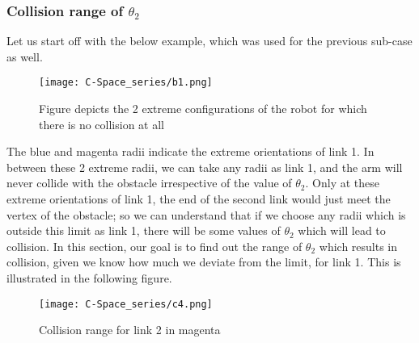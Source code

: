 \documentclass[12pt]{article}
\begin{document}
\subsubsection{Collision range of $\theta_2$}
Let us start off with the below example, which was used for the previous sub-case as well.
\begin{figure}[h!]
    \centering
    \begin{minipage}{0.8\textwidth}
        \centering
        \texttt{[image: C-Space\_series/b1.png]}
        \caption{Figure depicts the 2 extreme configurations of the robot for which there is no collision at all}
        \label{fig:b1}
    \end{minipage}
    \hfill
    
\end{figure}
\newline
The blue and magenta radii indicate the extreme orientations of link 1. In between these 2 extreme radii, we can take any radii as link 1, and the arm will never collide with the obstacle irrespective of the value of $\theta_2$.
\newline
\newline
Only at these extreme orientations of link 1, the end of the second link would just meet the vertex of the obstacle; so we can understand that if we choose any radii which is outside this limit as link 1, there will be some values of $\theta_2$ which will lead to collision.
\newline
\newline
In this section, our goal is to find out the range of $\theta_2$ which results in collision, given we know how much we deviate from the limit, for link 1. This is illustrated in the following figure.
\clearpage
\begin{figure}[h!]
    \centering
    \begin{minipage}{0.8\textwidth}
        \centering
        \texttt{[image: C-Space\_series/c4.png]}
        \caption{Collision range for link 2 in magenta}
        \label{fig:c4}
    \end{minipage}
    \hfill
    
\end{figure}
\newline
\end{document}
